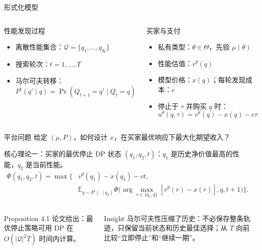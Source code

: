 \documentclass[aspectratio=169,10pt]{ctexbeamer}
\newcommand{\E}{\mathbb E}
\newcommand{\Q}{\mathcal Q}
\begin{document}
\begin{frame}{形式化模型}
\begin{columns}[T,onlytextwidth]
\begin{block}{性能发现过程}
\begin{itemize}
  \item 离散性能集合：$\Q=\{q_1,\ldots,q_K\}$
  \item 搜索轮次：$t=1,\ldots,T$
  \item 马尔可夫转移：
  \[
    P^t(q'\mid q)=\Pr(Q_{t+1}=q'\mid Q_t=q)
  \]
\end{itemize}
\end{block}
\begin{block}{买家与支付}
\begin{itemize}
  \item 私有类型：$\theta\in\Theta$，先验 $\mu(\theta)$
  \item 性能估值：$v^\theta(q)$
  \item 模型价格：$x(q)$；每轮发现成本：$c$
  \item 停止于 $\tau$ 并购买 $q$ 时：
  \[
    u^\theta(q,\tau)=v^\theta(q)-x(q)-c\tau
  \]
\end{itemize}
\end{block}
\end{columns}
\begin{alertblock}{平台问题}
给定 $(\mu,P)$，如何设计 $x$，在买家最优响应下最大化期望收入？
\end{alertblock}
\end{frame}

\begin{frame}{核心理论一：买家的最优停止 DP}
状态 $(q_1,q_2,t)$：$q_1$ 是历史净价值最高的性能，$q_2$ 是当前性能。
\small
\begin{align*}
\Phi(q_1,q_2,t)=\max\Big\{&v^\theta(q_1)-x(q_1)-ct,\\[-0.2em]
&\E_{q\sim P^t(\cdot\mid q_2)}
\Phi\big(\arg\max_{r\in\{q_1,q\}}[v^\theta(r)-x(r)],q,t+1\big)\Big\}.
\end{align*}
\normalsize
\begin{columns}[T,onlytextwidth]
\begin{block}{Proposition 4.1}
论文给出：最优停止策略可用 DP 在
$O(|\mathcal Q|^2T)$ 时间内计算。
\end{block}
\begin{exampleblock}{Insight}
马尔可夫性压缩了历史：不必保存整条轨迹，只保留当前状态和历史最佳选择；从 $T$ 向前比较“立即停止”和“继续一期”。
\end{exampleblock}
\end{columns}
\end{frame}
\end{document}

